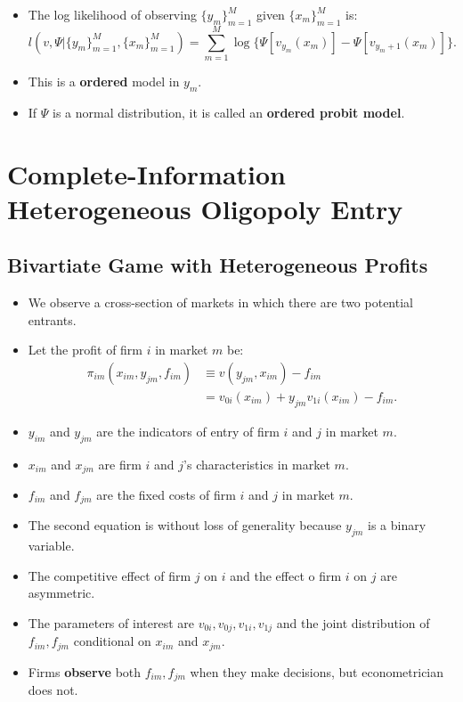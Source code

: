 \documentclass[]{book}
\providecommand{\tightlist}{%
  \setlength{\itemsep}{0pt}\setlength{\parskip}{0pt}}
\begin{document}
\begin{itemize}
\tightlist
\item
  The log likelihood of observing \(\{y_m\}_{m = 1}^M\) given
  \(\{x_m\}_{m = 1}^M\) is: \[
  l(v, \Psi|\{y_m\}_{m = 1}^M,  \{x_m\}_{m = 1}^M) = \sum_{m = 1}^M \log\{\Psi[v_{y_m}(x_m)] - \Psi[v_{y_m + 1}(x_m)]\}.
  \]
\item
  This is a \textbf{ordered} model in \(y_m\).
\item
  If \(\Psi\) is a normal distribution, it is called an \textbf{ordered
  probit model}.
\end{itemize}

\section{Complete-Information Heterogeneous Oligopoly
Entry}\label{complete-information-heterogeneous-oligopoly-entry}

\subsection{Bivartiate Game with Heterogeneous
Profits}\label{bivartiate-game-with-heterogeneous-profits}

\begin{itemize}
\tightlist
\item
  We observe a cross-section of markets in which there are two potential
  entrants.
\item
  Let the profit of firm \(i\) in market \(m\) be: \[
  \begin{split}
  \pi_{im}(x_{im}, y_{jm}, f_{im}) & \equiv v(y_{jm}, x_{im}) - f_{im}\\
  &=v_{0i}(x_{im}) + y_{jm} v_{1i}(x_{im}) - f_{im}.
  \end{split}
  \]
\item
  \(y_{im}\) and \(y_{jm}\) are the indicators of entry of firm \(i\)
  and \(j\) in market \(m\).
\item
  \(x_{im}\) and \(x_{jm}\) are firm \(i\) and \(j\)'s characteristics
  in market \(m\).
\item
  \(f_{im}\) and \(f_{jm}\) are the fixed costs of firm \(i\) and \(j\)
  in market \(m\).
\item
  The second equation is without loss of generality because \(y_{jm}\)
  is a binary variable.
\item
  The competitive effect of firm \(j\) on \(i\) and the effect o firm
  \(i\) on \(j\) are asymmetric.
\item
  The parameters of interest are \(v_{0i}, v_{0j}, v_{1i}, v_{1j}\) and
  the joint distribution of \(f_{im}, f_{jm}\) conditional on \(x_{im}\)
  and \(x_{jm}\).
\item
  Firms \textbf{observe} both \(f_{im}, f_{jm}\) when they make
  decisions, but econometrician does not.
\end{itemize}
\end{document}
